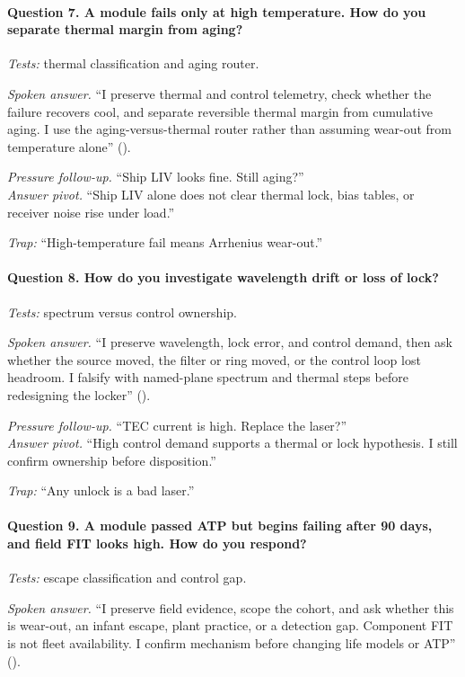 \paragraph{Question 7. A module fails only at high temperature. How do you
separate thermal margin from aging?}
\textit{Tests:} thermal classification and aging router.

\textit{Spoken answer.}
``I preserve thermal and control telemetry, check whether the failure recovers
cool, and separate reversible thermal margin from cumulative aging. I use the
aging-versus-thermal router rather than assuming wear-out from temperature
alone'' ().

\textit{Pressure follow-up.} ``Ship LIV looks fine. Still aging?''\\
\textit{Answer pivot.} ``Ship LIV alone does not clear thermal lock, bias
tables, or receiver noise rise under load.''

\textit{Trap:} ``High-temperature fail means Arrhenius wear-out.''

\paragraph{Question 8. How do you investigate wavelength drift or loss of
lock?}
\textit{Tests:} spectrum versus control ownership.

\textit{Spoken answer.}
``I preserve wavelength, lock error, and control demand, then ask whether the
source moved, the filter or ring moved, or the control loop lost headroom. I
falsify with named-plane spectrum and thermal steps before redesigning the
locker'' ().

\textit{Pressure follow-up.} ``TEC current is high. Replace the laser?''\\
\textit{Answer pivot.} ``High control demand supports a thermal or lock
hypothesis. I still confirm ownership before disposition.''

\textit{Trap:} ``Any unlock is a bad laser.''

\paragraph{Question 9. A module passed ATP but begins failing after 90 days, and
field FIT looks high. How do you respond?}
\textit{Tests:} escape classification and control gap.

\textit{Spoken answer.}
``I preserve field evidence, scope the cohort, and ask whether this is wear-out,
an infant escape, plant practice, or a detection gap. Component FIT is not
fleet availability. I confirm mechanism before changing life models or ATP''
().

